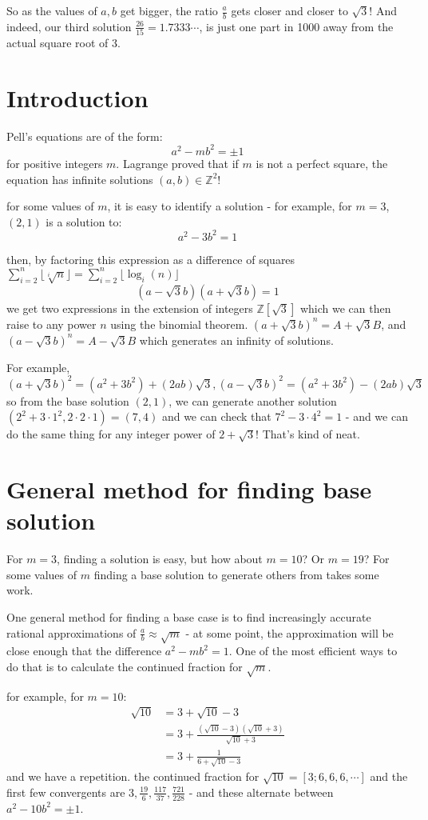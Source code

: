 \documentclass{article}
\begin{document}
So as the values of $a,b$ get bigger, the ratio $\frac{a}{b}$ gets closer and closer to $\sqrt{3}$!
And indeed, our third solution $\frac{26}{15} = 1.7333\cdots$, is just one part in 1000 away
from the actual square root of 3.

\section{Introduction}

Pell's equations are of the form:
\[ a^2-mb^2 = \pm 1 \]
for positive integers $m$. Lagrange proved that if $m$ is not a perfect square, the equation has infinite solutions $(a,b) \in \mathbb{Z}^2$!

for some values of $m$, it is easy to identify a solution - for example, for $m=3$, $(2,1)$ is a solution to:
\[a^2-3b^2=1 \]

then, by factoring this expression as a difference of squares $\sum_{i=2}^n \lfloor \sqrt[i]{n} \rfloor = \sum_{i=2}^n \lfloor \log_i (n) \rfloor$
\[(a-\sqrt{3}b)(a+\sqrt{3}b) = 1 \]
we get two expressions in the extension of integers $\mathbb{Z}[\sqrt{3}]$ which we can then raise to any power $n$ using the binomial theorem. $(a+\sqrt{3}b)^n = A + \sqrt{3}B$, and $(a-\sqrt{3}b)^n = A-\sqrt{3}B$ which generates an infinity of solutions.

For example, $(a+\sqrt{3}b)^2 = (a^2+3b^2) + (2ab)\sqrt{3}, (a-\sqrt{3}b)^2 = (a^2+3b^2)-(2ab)\sqrt{3}$ so from the base solution $(2,1)$, we can generate another solution $(2^2+3\cdot1^2,2\cdot2\cdot1) = (7,4)$ and we can check that $7^2-3\cdot4^2=1$ - and we can do the same thing for any integer power of $2+\sqrt{3}$! That's kind of neat.

\section{General method for finding base solution}

For $m=3$, finding a solution is easy, but how about $m=10$? Or $m=19$? For some values of $m$ finding a base solution to generate others from takes some work.

One general method for finding a base case is to find increasingly accurate rational approximations of $\frac{a}{b} \approx \sqrt{m}$ - at some point, the approximation will be close enough that the difference $ a^2-mb^2 = 1$. One of the most efficient ways to do that is to calculate the continued fraction for $\sqrt{m}$.

for example, for $m=10$:
\begin{align*}
    \sqrt{10} &= 3+\sqrt{10}-3 \\
    &= 3+\frac{(\sqrt{10}-3)(\sqrt{10}+3)}{\sqrt{10}+3} \\
    &= 3 + \frac{1}{6+\sqrt{10}-3}
\end{align*}
and we have a repetition. the continued fraction for $\sqrt{10} = [3;6,6,6,\cdots]$ and the first few convergents are $3,\frac{19}{6},\frac{117}{37}, \frac{721}{228}$ - and these alternate between $a^2-10b^2=\pm1$.
\end{document}
